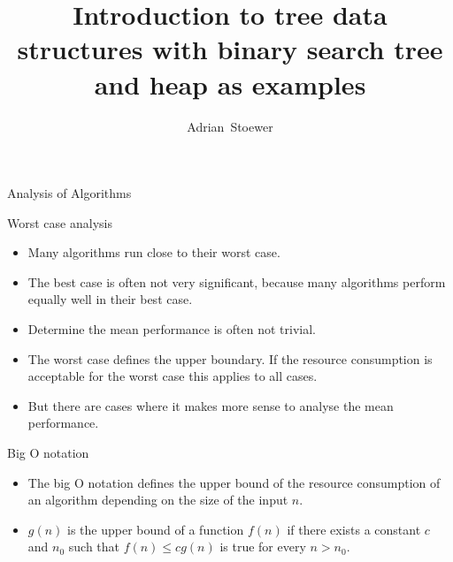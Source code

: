 \documentclass{beamer}
\title[BST and Heaps] 
{
    Introduction to tree data structures with binary search tree 
    and heap as examples
}
\author[Adrian Stoewer]{
    Adrian~Stoewer
}
\begin{document}
\begin{frame}
  \titlepage
\end{frame}



\begin{frame}
    \begin{center}
        \begin{LARGE}
            Analysis of Algorithms
        \end{LARGE}
    \end{center}
\end{frame}

\begin{frame}{Worst case analysis}
    \begin{itemize}
    
        \item Many algorithms run close to their worst case.
        
        \item The best case is often not very significant, because many
              algorithms perform equally well in their best case.
              
        \item Determine the mean performance is often not trivial.
        
        \item The worst case defines the upper boundary. If the resource consumption
              is acceptable for the worst case this applies to all cases.
              
        \item But there are cases where it makes more sense to analyse the mean
              performance.
    
    \end{itemize}
\end{frame}


\begin{frame}{Big O notation}
    \begin{itemize}
    
        \item The big O notation defines the upper bound of the resource
              consumption of an algorithm depending on the size of the input $n$.
              
        \item $g(n)$ is the upper bound of a function $f(n)$ if there exists a constant
              $c$ and $n_0$ such that $f(n) \leq cg(n)$ is true for every $n > n_0$.
    
    \end{itemize}
\end{frame}
\end{document}
